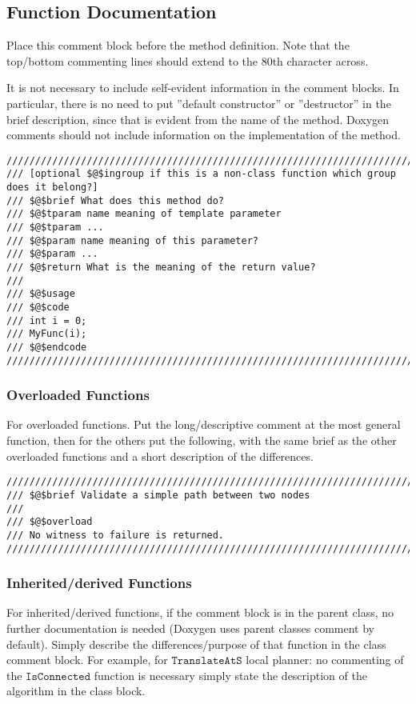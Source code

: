 \documentclass[12pt]{article}
\begin{document}
\subsection{Function Documentation}

Place this comment block before the method definition. Note that the top/bottom
commenting lines should extend to the 80th character across.

It is not necessary to include self-evident information in the comment blocks.
In particular, there is no need to put ”default constructor” or ”destructor” in
the brief description, since that is evident from the name of the method.
Doxygen comments should not include information on the implementation of the
method.

\begin{lstlisting}[mathescape]
///////////////////////////////////////////////////////////////////////////////
/// [optional $@$ingroup if this is a non-class function which group does it belong?]
/// $@$brief What does this method do?
/// $@$tparam name meaning of template parameter
/// $@$tparam ...
/// $@$param name meaning of this parameter?
/// $@$param ...
/// $@$return What is the meaning of the return value?
///
/// $@$usage
/// $@$code
/// int i = 0;
/// MyFunc(i);
/// $@$endcode
///////////////////////////////////////////////////////////////////////////////
\end{lstlisting}

\subsubsection{Overloaded Functions}

For overloaded functions. Put the long/descriptive comment at the most general
function, then for the others put the following, with the same brief as the
other overloaded functions and a short description of the differences.

\begin{lstlisting}[mathescape]
///////////////////////////////////////////////////////////////////////////////
/// $@$brief Validate a simple path between two nodes
///
/// $@$overload
/// No witness to failure is returned.
///////////////////////////////////////////////////////////////////////////////
\end{lstlisting}

\subsubsection{Inherited/derived Functions}
For inherited/derived functions, if the comment block is in the parent class,
no further documentation is needed (Doxygen uses parent classes comment by
default). Simply describe the differences/purpose of that function in the class
comment block. For example, for $\mathtt{TranslateAtS}$ local planner: no
commenting of the $\mathtt{IsConnected}$ function is necessary simply state the
description of the algorithm in the class block.
\end{document}
